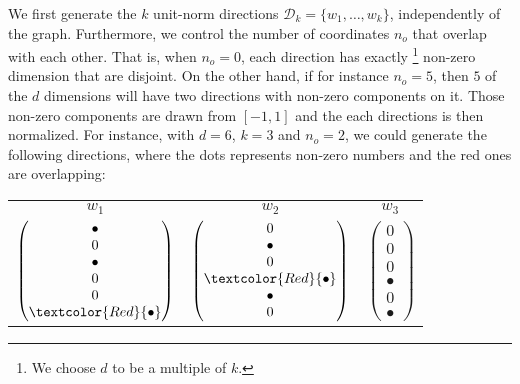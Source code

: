 We first generate the $k$ unit-norm directions $\mathcal{D}_k=\{w_1, \ldots, w_k\}$, independently
of the graph. Furthermore, we control the number of coordinates $n_o$ that overlap with each other.
That is, when $n_o = 0$, each direction has exactly \footnote{We choose $d$ to be a
multiple of $k$.} non-zero dimension that are disjoint. On the other hand, if for instance $n_o=5$,
then $5$ of the $d$ dimensions will have two directions with non-zero components on it. Those
non-zero components are drawn \uar{} from $[-1, 1]$ and the each directions is then normalized. For
instance, with $d=6$, $k=3$ and $n_o=2$, we could generate the following directions, where the dots
represents non-zero numbers and the red ones are overlapping:
\vspace{-.5\baselineskip}
\begin{center}
  \begin{tabular}{ccc}
    $w_1$ & $w_2$ & $w_3$ \\
    $\begin{pmatrix}
      \bullet \\
      0 \\
      \bullet \\
      0 \\
      0 \\
      \textcolor{Red}{\bullet}
    \end{pmatrix}$ &
    $\begin{pmatrix}
      0 \\
      \bullet \\
      0 \\
      \textcolor{Red}{\bullet} \\
      \bullet \\
      0
    \end{pmatrix}$ &
    $\begin{pmatrix}
      0 \\
      0 \\
      0 \\
      \bullet \\
      0 \\
      \bullet
    \end{pmatrix}$
  \end{tabular}
\end{center}

